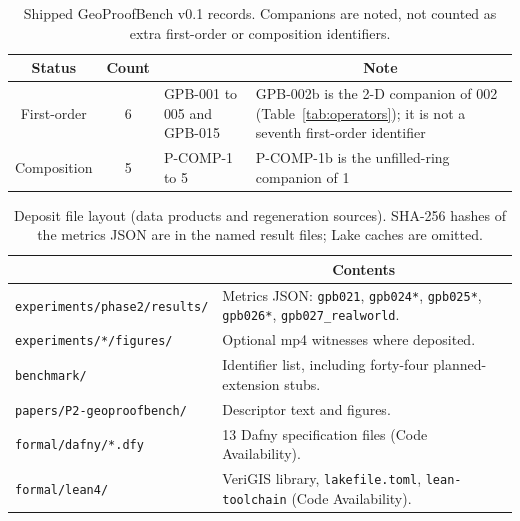 \documentclass[11pt,a4paper]{article}
\newcommand{\thead}[1]{\multicolumn{1}{c}{#1}}
\begin{document}
\begin{table}[!htbp]
\centering
\caption{Shipped GeoProofBench v0.1 records. Companions are noted, not
counted as extra first-order or composition identifiers.}
\label{tab:catalog}
\small
\begin{tabularx}{\textwidth}{cc>{\raggedright\arraybackslash}m{4.8cm}X}
\toprule
\thead{Status} & \thead{Count} & \thead{Identifiers} & \thead{Note} \\
\midrule
First-order & 6 & GPB-001 to 005 and GPB-015 &
GPB-002b is the 2-D companion of 002 (Table~\ref*{tab:operators});
it is not a seventh first-order identifier \\
Composition & 5 & P-COMP-1 to 5 &
P-COMP-1b is the unfilled-ring companion of 1 \\
\bottomrule
\end{tabularx}
\end{table}

\begin{table}[!htbp]
\centering
\caption{Deposit file layout (data products and regeneration sources).
SHA-256 hashes of the metrics JSON are in the named result files;
Lake caches are omitted.}
\label{tab:files}
\small
\begin{tabularx}{\textwidth}{>{\raggedright\arraybackslash}m{4.6cm}X}
\toprule
\thead{Path} & \thead{Contents} \\
\midrule
\texttt{experiments/}\newline\texttt{phase2/results/} &
Metrics JSON: \texttt{gpb021}, \texttt{gpb024*}, \texttt{gpb025*},
\texttt{gpb026*}, \texttt{gpb027\_realworld}. \\
\texttt{experiments/*/figures/} &
Optional mp4 witnesses where deposited. \\
\texttt{benchmark/} &
Identifier list, including forty-four planned-extension stubs. \\
\texttt{papers/P2-geoproofbench/} &
Descriptor text and figures. \\
\texttt{formal/dafny/*.dfy} &
13 Dafny specification files (Code Availability). \\
\texttt{formal/lean4/} &
VeriGIS library, \texttt{lakefile.toml}, \texttt{lean-toolchain}
(Code Availability). \\
\bottomrule
\end{tabularx}
\end{table}
\end{document}

